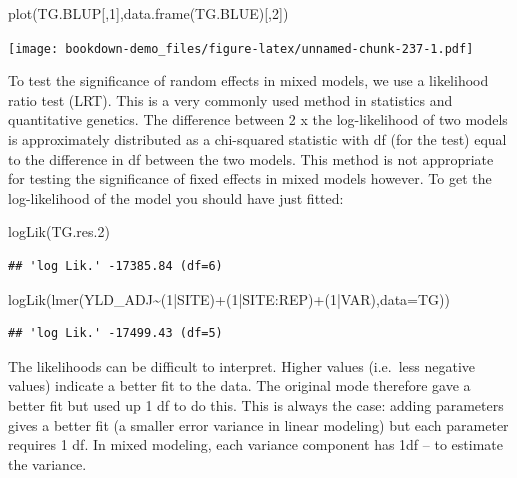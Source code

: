 \documentclass[
]{book}
\newenvironment{Shaded}{\begin{snugshade}}{\end{snugshade}}
\newcommand{\AttributeTok}[1]{\textcolor[rgb]{0.77,0.63,0.00}{#1}}
\newcommand{\DecValTok}[1]{\textcolor[rgb]{0.00,0.00,0.81}{#1}}
\newcommand{\FloatTok}[1]{\textcolor[rgb]{0.00,0.00,0.81}{#1}}
\newcommand{\FunctionTok}[1]{\textcolor[rgb]{0.00,0.00,0.00}{#1}}
\newcommand{\NormalTok}[1]{#1}
\newcommand{\SpecialCharTok}[1]{\textcolor[rgb]{0.00,0.00,0.00}{#1}}
\begin{document}
\begin{Shaded}
\begin{Highlighting}[]
\FunctionTok{plot}\NormalTok{(TG.BLUP[,}\DecValTok{1}\NormalTok{],}\FunctionTok{data.frame}\NormalTok{(TG.BLUE)[,}\DecValTok{2}\NormalTok{])}
\end{Highlighting}
\end{Shaded}

\texttt{[image: bookdown-demo\_files/figure-latex/unnamed-chunk-237-1.pdf]}

To test the significance of random effects in mixed models, we use a likelihood ratio test (LRT). This is a very commonly used method in statistics and quantitative genetics. The difference between 2 x the log-likelihood of two models is approximately distributed as a chi-squared statistic with df (for the test) equal to the difference in df between the two models. This method is not appropriate for testing the significance of fixed effects in mixed models however. To get the log-likelihood of the model you should have just fitted:

\begin{Shaded}
\begin{Highlighting}[]
\FunctionTok{logLik}\NormalTok{(TG.res}\FloatTok{.2}\NormalTok{)}
\end{Highlighting}
\end{Shaded}

\begin{verbatim}
## 'log Lik.' -17385.84 (df=6)
\end{verbatim}

\begin{Shaded}
\begin{Highlighting}[]
\FunctionTok{logLik}\NormalTok{(}\FunctionTok{lmer}\NormalTok{(YLD\_ADJ}\SpecialCharTok{\textasciitilde{}}\NormalTok{(}\DecValTok{1}\SpecialCharTok{|}\NormalTok{SITE)}\SpecialCharTok{+}\NormalTok{(}\DecValTok{1}\SpecialCharTok{|}\NormalTok{SITE}\SpecialCharTok{:}\NormalTok{REP)}\SpecialCharTok{+}\NormalTok{(}\DecValTok{1}\SpecialCharTok{|}\NormalTok{VAR),}\AttributeTok{data=}\NormalTok{TG))}
\end{Highlighting}
\end{Shaded}

\begin{verbatim}
## 'log Lik.' -17499.43 (df=5)
\end{verbatim}

The likelihoods can be difficult to interpret. Higher values (i.e.~less negative values) indicate a better fit to the data. The original mode therefore gave a better fit but used up 1 df to do this. This is always the case: adding parameters gives a better fit (a smaller error variance in linear modeling) but each parameter requires 1 df. In mixed modeling, each variance component has 1df -- to estimate the variance.
\end{document}
